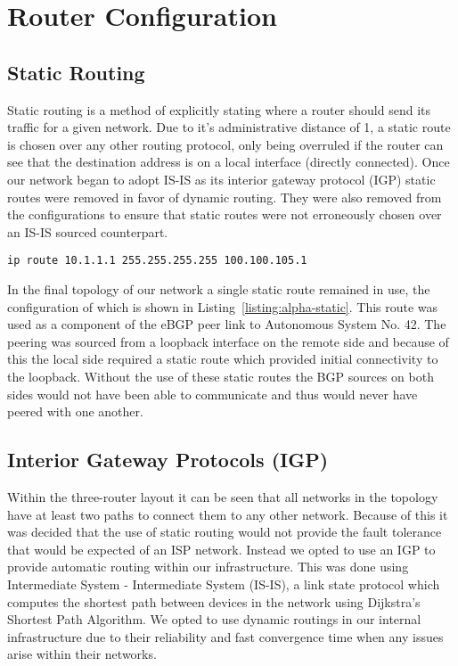 \chapter{Router Configuration}
\section{Static Routing}
Static routing is a method of explicitly stating where a router should send its
traffic for a given network. Due to it's administrative distance of 1, a static
route is chosen over any other routing protocol, only being overruled if the
router can see that the destination address is on a local interface (directly
connected). Once our network began to adopt IS-IS as its interior gateway
protocol (IGP) static routes were removed in favor of dynamic routing. They
were also removed from the configurations to ensure that static routes were not
erroneously chosen over an IS-IS sourced counterpart.

\begin{lstlisting}[caption={Alpha Static Route}, label={listing:alpha-static}]
ip route 10.1.1.1 255.255.255.255 100.100.105.1
\end{lstlisting}

In the final topology of our network a single static route remained in use, the
configuration of which is shown in Listing~\ref{listing:alpha-static}. This
route was used as a component of the eBGP peer link to Autonomous System No.
42. The peering was sourced from a loopback interface on the remote side and
    because of this the local side required a static route which provided
    initial connectivity to the loopback. Without the use of these static
    routes the BGP sources on both sides would not have been able to
    communicate and thus would never have peered with one another.

\section{Interior Gateway Protocols (IGP)}
Within the three-router layout it can be seen that all networks in the topology
have at least two paths to connect them to any other network. Because of this
it was decided that the use of static routing would not provide the fault
tolerance that would be expected of an ISP network. Instead we opted to use an
IGP to provide automatic routing within our infrastructure. This was done using
Intermediate System - Intermediate System (IS-IS), a link state protocol which
computes the shortest path between devices in the network using Dijkstra's
Shortest Path Algorithm. We opted to use dynamic routings in our internal
infrastructure due to their reliability and fast convergence time when any
issues arise within their networks.

